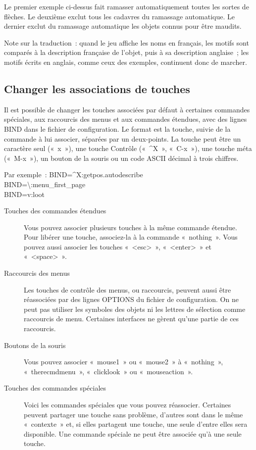 \documentclass[titlepage]{article}
\begin{document}
Le premier exemple ci-dessus fait ramasser automatiquement toutes les
sortes de flèches.
Le deuxième exclut tous les cadavres du ramassage automatique.
Le dernier exclut du ramassage automatique les objets connus pour être
maudits.


Note sur la traduction~: quand le jeu affiche les noms en français, les
motifs sont comparés à la description française de l'objet, puis à sa
description anglaise~; les motifs écrits en anglais, comme ceux des
exemples, continuent donc de marcher.

\subsection{Changer les associations de touches}



Il est possible de changer les touches associées par défaut à certaines
commandes spéciales, aux raccourcis des menus et aux commandes étendues,
avec des lignes BIND dans le fichier de configuration.
Le format est la touche, suivie de la commande à lui associer, séparées
par un deux-points.
La touche peut être un caractère seul («~x~»), une touche
Contrôle («~\textasciicircum{}X~», «~C-x~»), une touche méta
(«~M-x~»), un bouton de la souris ou un code ASCII décimal à trois
chiffres.


Par exemple~:
BIND=\textasciicircum{}X:getpos.autodescribe\\
BIND=\textbackslash{}:menu\_first\_page\\
BIND=v:loot\\



\begin{description}
\item[{Touches des commandes étendues}]
Vous pouvez associer plusieurs touches à la même commande étendue.
Pour libérer une touche, associez-la à la commande «~nothing~».
Vous pouvez aussi associer les touches «~\textless{}esc\textgreater{}~»,
«~\textless{}enter\textgreater{}~» et «~\textless{}space\textgreater{}~».

\item[{Raccourcis des menus}]
Les touches de contrôle des menus, ou raccourcis, peuvent aussi être
réassociées par des lignes OPTIONS du fichier de configuration.
On ne peut pas utiliser les symboles des objets ni les lettres de sélection
comme raccourcis de menu.
Certaines interfaces ne gèrent qu'une partie de ces raccourcis.

\item[{Boutons de la souris}]
Vous pouvez associer «~mouse1~» ou «~mouse2~» à
«~nothing~», «~therecmdmenu~», «~clicklook~» ou
«~mouseaction~».

\item[{Touches des commandes spéciales}]
Voici les commandes spéciales que vous pouvez réassocier.
Certaines peuvent partager une touche sans problème, d'autres sont dans le
même «~contexte~» et, si elles partagent une touche, une seule
d'entre elles sera disponible.
Une commande spéciale ne peut être associée qu'à une seule touche.

\end{description}
\end{document}
